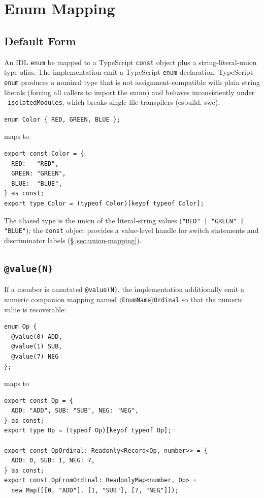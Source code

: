 \documentclass{../styles/zerodds-vendor-spec}
\begin{document}
\section{Enum Mapping}\label{sec:enum-mapping}

\subsection{Default Form}

An IDL \texttt{enum}  be mapped to a TypeScript
\texttt{const} object plus a string-literal-union type alias.
The implementation  emit a TypeScript
\texttt{enum} declaration: TypeScript \texttt{enum} produces a
nominal type that is not assignment-compatible with plain
string literals (forcing all callers to import the enum) and
behaves inconsistently under \texttt{--isolatedModules}, which
breaks single-file transpilers (esbuild, swc).

\begin{specexample}
\begin{lstlisting}
enum Color { RED, GREEN, BLUE };
\end{lstlisting}
maps to
\begin{lstlisting}
export const Color = {
  RED:   "RED",
  GREEN: "GREEN",
  BLUE:  "BLUE",
} as const;
export type Color = (typeof Color)[keyof typeof Color];
\end{lstlisting}
\end{specexample}

The aliased type is the union of the literal-string values
(\texttt{"RED" | "GREEN" | "BLUE"}); the \texttt{const}
object provides a value-level handle for switch statements and
discriminator labels (\S\,\ref{sec:union-mapping}).

\subsection{\texttt{@value(N)}}

If a member is annotated \texttt{@value(N)}, the implementation
 additionally emit a numeric companion mapping
named \texttt{$\langle$EnumName$\rangle$Ordinal} so that the
numeric value is recoverable:

\begin{specexample}
\begin{lstlisting}
enum Op {
  @value(0) ADD,
  @value(1) SUB,
  @value(7) NEG
};
\end{lstlisting}
maps to
\begin{lstlisting}
export const Op = {
  ADD: "ADD", SUB: "SUB", NEG: "NEG",
} as const;
export type Op = (typeof Op)[keyof typeof Op];

export const OpOrdinal: Readonly<Record<Op, number>> = {
  ADD: 0, SUB: 1, NEG: 7,
} as const;
export const OpFromOrdinal: ReadonlyMap<number, Op> =
  new Map([[0, "ADD"], [1, "SUB"], [7, "NEG"]]);
\end{lstlisting}
\end{specexample}
\end{document}
